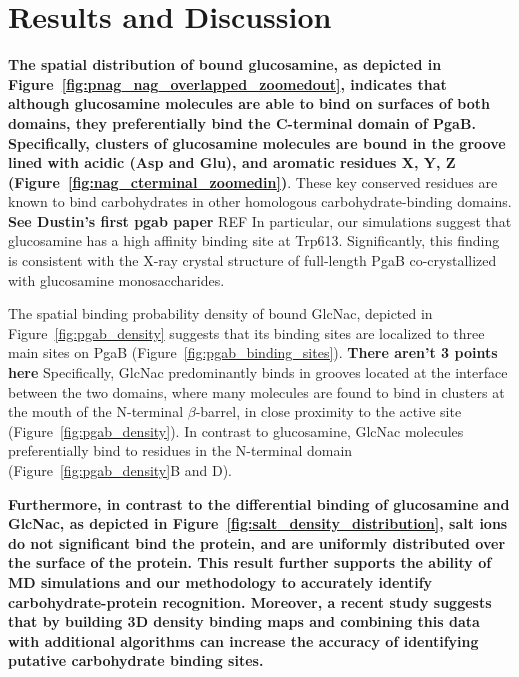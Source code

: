 \section{Results and Discussion}

\textbf{The spatial distribution of bound glucosamine, as depicted in Figure~\ref{fig:pnag_nag_overlapped_zoomedout}, indicates that although glucosamine molecules are able to bind on surfaces of both domains, they preferentially bind the C-terminal domain of PgaB. Specifically, clusters of glucosamine molecules are bound in the groove lined with acidic (Asp and Glu), and aromatic residues X, Y, Z (Figure~\ref{fig:nag_cterminal_zoomedin})}.  These key conserved residues are known to bind carbohydrates in other homologous carbohydrate-binding domains. \textbf{See Dustin's first pgab paper} REF In particular, our simulations suggest that glucosamine has a high affinity binding site at Trp613. Significantly, this finding is consistent with the X-ray crystal structure of full-length PgaB co-crystallized with glucosamine monosaccharides.

The spatial binding probability density of bound GlcNac, depicted in Figure~\ref{fig:pgab_density} suggests that its binding sites are localized to three main sites on PgaB (Figure~\ref{fig:pgab_binding_sites}). \textbf{There aren't 3 points here} Specifically, GlcNac predominantly binds in grooves located at the interface between the two domains, where many molecules are found to bind in clusters at the mouth of the N-terminal $\beta$-barrel, in close proximity to the active site (Figure~\ref{fig:pgab_density}).  In contrast to glucosamine, GlcNac molecules preferentially bind to residues in the N-terminal domain (Figure~\ref{fig:pgab_density}B and D).  



\textbf{Furthermore, in contrast to the differential binding of glucosamine and GlcNac, as depicted in Figure~\ref{fig:salt_density_distribution}, salt ions do not significant bind the protein, and are uniformly distributed over the surface of the protein.   This result further supports the ability of MD simulations and our methodology to accurately identify carbohydrate-protein recognition. Moreover, a recent study suggests that by building 3D density binding maps and combining this data with additional algorithms can increase the accuracy of identifying putative carbohydrate binding sites.\cite{Tsai:2012bj}}



